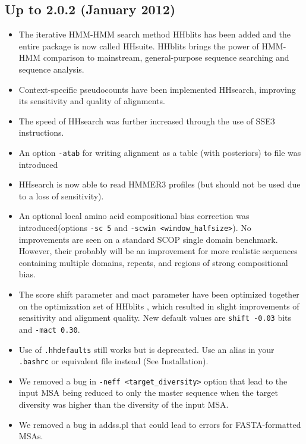 \documentclass[11pt,a4paper]{article}
\begin{document}
\subsection{Up to 2.0.2 (January 2012)}
\begin{itemize}

\item The iterative HMM-HMM search method HHblits has been added and the entire package is now called HHsuite. HHblits brings the power of HMM-HMM comparison to mainstream, general-purpose sequence searching and sequence analysis. 

\item Context-specific pseudocounts have been implemented HHsearch, improving its sensitivity and quality of alignments.

\item The speed of HHsearch was further increased through the use of SSE3 instructions.

\item An option \verb`-atab` for writing alignment as a table (with posteriors) to file was introduced

\item HHsearch is now able to read HMMER3 profiles (but should not be used due to a loss of sensitivity).

\item An optional local amino acid compositional bias correction was introduced(options \verb`-sc 5` and \verb`-scwin <window_halfsize>`). No improvements are seen on a standard SCOP single domain benchmark. However, their probably will be an improvement for more realistic sequences containing multiple domains, repeats, and regions of strong compositional bias. 

\item The score shift parameter and mact parameter have been optimized together on the optimization set of HHblits \cite{Remmert:2011}, which resulted in slight improvements of sensitivity and alignment quality. New default values are  \verb`shift -0.03` bits and \verb`-mact 0.30`. 

\item Use of \verb`.hhdefaults` still works but is deprecated. Use an alias in 
your \verb`.bashrc` or equivalent file instead (See Installation).

\item We removed a bug in \verb`-neff <target_diversity>` option that lead to the input MSA being reduced to only the master sequence when the target diversity was higher than the diversity of the input MSA.

\item We removed a bug in addss.pl that could lead to errors for FASTA-formatted MSAs.

\end{itemize}
\end{document}
